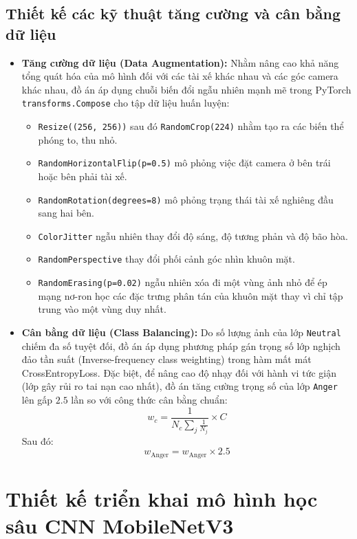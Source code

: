 \documentclass[../DoAn.tex]{subfiles}
\begin{document}
\subsection{Thiết kế các kỹ thuật tăng cường và cân bằng dữ liệu}
\begin{itemize}
    \item \textbf{Tăng cường dữ liệu (Data Augmentation):} Nhằm nâng cao khả năng tổng quát hóa của mô hình đối với các tài xế khác nhau và các góc camera khác nhau, đồ án áp dụng chuỗi biến đổi ngẫu nhiên mạnh mẽ trong PyTorch \texttt{transforms.Compose} cho tập dữ liệu huấn luyện:
    \begin{itemize}
        \item \texttt{Resize((256, 256))} sau đó \texttt{RandomCrop(224)} nhằm tạo ra các biến thể phóng to, thu nhỏ.
        \item \texttt{RandomHorizontalFlip(p=0.5)} mô phỏng việc đặt camera ở bên trái hoặc bên phải tài xế.
        \item \texttt{RandomRotation(degrees=8)} mô phỏng trạng thái tài xế nghiêng đầu sang hai bên.
        \item \texttt{ColorJitter} ngẫu nhiên thay đổi độ sáng, độ tương phản và độ bão hòa.
        \item \texttt{RandomPerspective} thay đổi phối cảnh góc nhìn khuôn mặt.
        \item \texttt{RandomErasing(p=0.02)} ngẫu nhiên xóa đi một vùng ảnh nhỏ để ép mạng nơ-ron học các đặc trưng phân tán của khuôn mặt thay vì chỉ tập trung vào một vùng duy nhất.
    \end{itemize}
    \item \textbf{Cân bằng dữ liệu (Class Balancing):} Do số lượng ảnh của lớp \texttt{Neutral} chiếm đa số tuyệt đối, đồ án áp dụng phương pháp gán trọng số lớp nghịch đảo tần suất (Inverse-frequency class weighting) trong hàm mất mát CrossEntropyLoss. Đặc biệt, để nâng cao độ nhạy đối với hành vi tức giận (lớp gây rủi ro tai nạn cao nhất), đồ án tăng cường trọng số của lớp \texttt{Anger} lên gấp $2.5$ lần so với công thức cân bằng chuẩn:
    \[ w_c = \frac{1}{N_c \sum_{j} \frac{1}{N_j}} \times C \]
    Sau đó:
    \[ w_{\text{Anger}} = w_{\text{Anger}} \times 2.5 \]
\end{itemize}

\section{Thiết kế triển khai mô hình học sâu CNN MobileNetV3}
\label{section:4.4}
\end{document}

